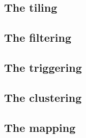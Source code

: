 \subsection{The tiling} \label{sec:algorithm:tiling}

\subsection{The filtering} \label{sec:algorithm:conditioning}

\subsection{The triggering} \label{sec:algorithm:triggering}

\subsection{The clustering} \label{sec:algorithm:conditioning}

\subsection{The mapping} \label{sec:algorithm:mapping}
